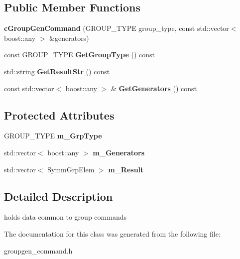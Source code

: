\subsection*{Public Member Functions}
\begin{DoxyCompactItemize}
\item 
\hypertarget{classengine_1_1cGroupGenCommand_a94d3c632e772f19a07dfb15a4d46a0d4}{{\bfseries c\-Group\-Gen\-Command} (G\-R\-O\-U\-P\-\_\-\-T\-Y\-P\-E group\-\_\-type, const std\-::vector$<$ boost\-::any $>$ \&generators)}\label{classengine_1_1cGroupGenCommand_a94d3c632e772f19a07dfb15a4d46a0d4}

\item 
\hypertarget{classengine_1_1cGroupGenCommand_a37b02fb65826fa2bccc6ca071eec3c64}{const G\-R\-O\-U\-P\-\_\-\-T\-Y\-P\-E {\bfseries Get\-Group\-Type} () const }\label{classengine_1_1cGroupGenCommand_a37b02fb65826fa2bccc6ca071eec3c64}

\item 
\hypertarget{classengine_1_1cGroupGenCommand_a52d7b740fa0441fd0cea5f881a4f8dba}{std\-::string {\bfseries Get\-Result\-Str} () const }\label{classengine_1_1cGroupGenCommand_a52d7b740fa0441fd0cea5f881a4f8dba}

\item 
\hypertarget{classengine_1_1cGroupGenCommand_a423b76a5c2dbf49db40655f968f15758}{const std\-::vector$<$ boost\-::any $>$ \& {\bfseries Get\-Generators} () const }\label{classengine_1_1cGroupGenCommand_a423b76a5c2dbf49db40655f968f15758}

\end{DoxyCompactItemize}
\subsection*{Protected Attributes}
\begin{DoxyCompactItemize}
\item 
\hypertarget{classengine_1_1cGroupGenCommand_ab878cfec34e06b0768f6efdbf9deb9fa}{G\-R\-O\-U\-P\-\_\-\-T\-Y\-P\-E {\bfseries m\-\_\-\-Grp\-Type}}\label{classengine_1_1cGroupGenCommand_ab878cfec34e06b0768f6efdbf9deb9fa}

\item 
\hypertarget{classengine_1_1cGroupGenCommand_acff9a3269f987eadf5b39412c09fe497}{std\-::vector$<$ boost\-::any $>$ {\bfseries m\-\_\-\-Generators}}\label{classengine_1_1cGroupGenCommand_acff9a3269f987eadf5b39412c09fe497}

\item 
\hypertarget{classengine_1_1cGroupGenCommand_a82938b2e1e2254bbecd5862d75025834}{std\-::vector$<$ Symm\-Grp\-Elem $>$ {\bfseries m\-\_\-\-Result}}\label{classengine_1_1cGroupGenCommand_a82938b2e1e2254bbecd5862d75025834}

\end{DoxyCompactItemize}


\subsection{Detailed Description}
holds data common to group commands 

The documentation for this class was generated from the following file\-:\begin{DoxyCompactItemize}
\item 
groupgen\-\_\-command.\-h\end{DoxyCompactItemize}
